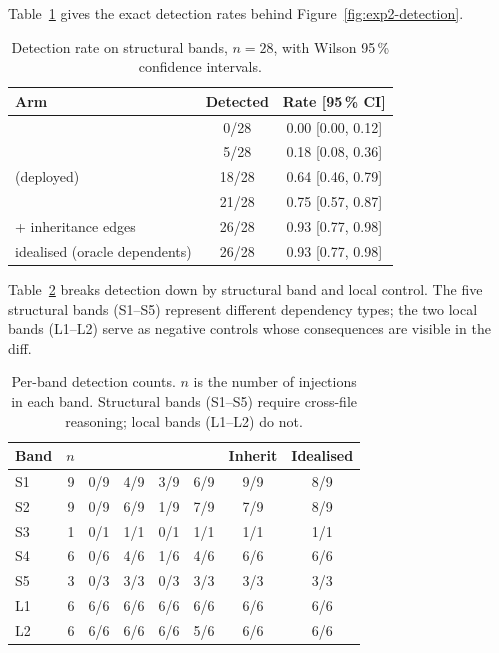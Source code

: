 Table~\ref{tab:exp2-detection} gives the exact detection rates behind
Figure~\ref{fig:exp2-detection}.

\begin{table}[htbp]
    \centering
    \caption{Detection rate on structural bands, $n = 28$, with Wilson
             95\,\% confidence intervals.}
    \label{tab:exp2-detection}
    \small
    \begin{tabular}{lcc}
        \toprule
        Arm & Detected & Rate [95\,\% CI] \\
        \midrule
        \baseline{}                 & 0/28  & 0.00 [0.00, 0.12] \\
        \rag{}                      & 5/28  & 0.18 [0.08, 0.36] \\
        \kg{} (deployed)            & 18/28 & 0.64 [0.46, 0.79] \\
        \hybrid{}                   & 21/28 & 0.75 [0.57, 0.87] \\
        \midrule
        \kg{} + inheritance edges   & 26/28 & 0.93 [0.77, 0.98] \\
        \kg{} idealised (oracle dependents) & 26/28 & 0.93 [0.77, 0.98] \\
        \bottomrule
    \end{tabular}
\end{table}

Table~\ref{tab:exp2-perband} breaks detection down by structural band and
local control. The five structural bands (S1--S5) represent different
dependency types; the two local bands (L1--L2) serve as negative controls
whose consequences are visible in the diff.

\begin{table}[htbp]
    \centering
    \caption{Per-band detection counts. $n$ is the number of injections in
             each band. Structural bands (S1--S5) require cross-file
             reasoning; local bands (L1--L2) do not.}
    \label{tab:exp2-perband}
    \small
    \begin{tabular}{lrcccccc}
        \toprule
        Band & $n$ & \baseline{} & \kg{} & \rag{} & \hybrid{} & Inherit & Idealised \\
        \midrule
        S1 & 9  & 0/9  & 4/9  & 3/9  & 6/9  & 9/9  & 8/9  \\
        S2 & 9  & 0/9  & 6/9  & 1/9  & 7/9  & 7/9  & 8/9  \\
        S3 & 1  & 0/1  & 1/1  & 0/1  & 1/1  & 1/1  & 1/1  \\
        S4 & 6  & 0/6  & 4/6  & 1/6  & 4/6  & 6/6  & 6/6  \\
        S5 & 3  & 0/3  & 3/3  & 0/3  & 3/3  & 3/3  & 3/3  \\
        \midrule
        L1 & 6  & 6/6  & 6/6  & 6/6  & 6/6  & 6/6  & 6/6  \\
        L2 & 6  & 6/6  & 6/6  & 6/6  & 5/6  & 6/6  & 6/6  \\
        \bottomrule
    \end{tabular}
\end{table}


